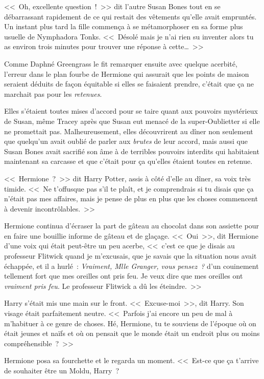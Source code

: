 <<~Oh, excellente question~!~>> dit l'autre Susan Bones tout en se débarrassant rapidement de ce qui restait des vêtements qu'elle avait empruntés. Un instant plus tard la fille commença à se métamorphoser en sa forme plus usuelle de Nymphadora Tonks. <<~Désolé mais je n'ai rien su inventer alors tu as environ trois minutes pour trouver une réponse à cette…~>>

\later

Comme Daphné Greengrass le fit remarquer ensuite avec quelque acerbité, l'erreur dans le plan fourbe de Hermione qui assurait que les points de maison seraient déduits de façon équitable si elles se faisaient prendre, c'était que ça ne marchait pas pour les \emph{retenues}.

Elles s'étaient toutes mises d'accord pour se taire quant aux pouvoirs mystérieux de Susan, même Tracey après que Susan eut menacé de la super-Oublietter si elle ne promettait pas. Malheureusement, elles découvrirent au dîner non seulement que quelqu'un avait oublié de parler aux \emph{brutes} de leur accord, mais aussi que Susan Bones avait sacrifié son âme à de terribles pouvoirs interdits qui habitaient maintenant sa carcasse et que c'était pour ça qu'elles étaient toutes en retenue.

<<~Hermione~?~>> dit Harry Potter, assis à côté d'elle au dîner, sa voix très timide. <<~Ne t'offusque pas s'il te plaît, et je comprendrais si tu disais que ça n'était pas mes affaires, mais je pense de plus en plus que les choses commencent à devenir incontrôlables.~>>

Hermione continua d'écraser la part de gâteau au chocolat dans son assiette pour en faire une bouillie informe de gâteau et de glaçage. <<~Oui~>>, dit Hermione d'une voix qui était peut-être un peu acerbe, <<~c'est ce que je disais au professeur Flitwick quand je m'excusais, que je savais que la situation nous avait échappée, et il a hurlé~: \emph{Vraiment, Mlle Granger, vous pensez~?} d'un couinement tellement fort que mes oreilles ont pris feu. Je veux dire que mes oreilles ont \emph{vraiment pris feu}. Le professeur Flitwick a dû les éteindre.~>>

Harry s'était mis une main sur le front. <<~Excuse-moi~>>, dit Harry. Son visage était parfaitement neutre. <<~Parfois j'ai encore un peu de mal à m'habituer à ce genre de choses. Hé, Hermione, tu te souviens de l'époque où on était jeunes et naïfs et où on pensait que le monde était un endroit plus ou moins compréhensible~?~>>

Hermione posa sa fourchette et le regarda un moment. <<~Est-ce que ça t'arrive de souhaiter être un Moldu, Harry~?

